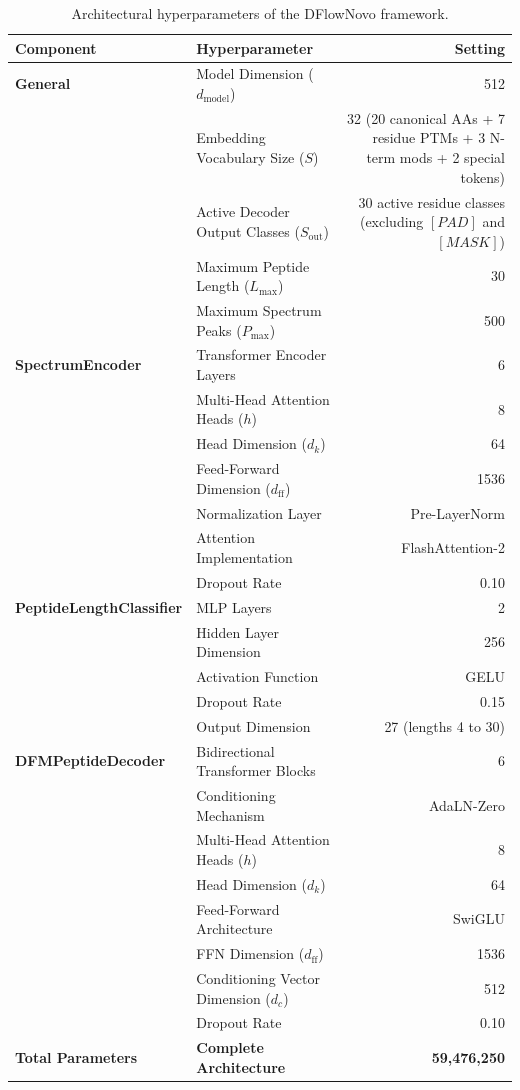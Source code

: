 \begin{table}[!ht]
\centering
\small
\begin{tabular}{llr}
\toprule
\textbf{Component} & \textbf{Hyperparameter} & \textbf{Setting} \\
\midrule
\textbf{General} & Model Dimension ($d_{\text{model}}$) & 512 \\
& Embedding Vocabulary Size ($S$) & 32 (20 canonical AAs + 7 residue PTMs + 3 N-term mods + 2 special tokens) \\
& Active Decoder Output Classes ($S_{\text{out}}$) & 30 active residue classes (excluding $[PAD]$ and $[MASK]$) \\
& Maximum Peptide Length ($L_{\max}$) & 30 \\
& Maximum Spectrum Peaks ($P_{\max}$) & 500 \\
\midrule
\textbf{SpectrumEncoder} & Transformer Encoder Layers & 6 \\
& Multi-Head Attention Heads ($h$) & 8 \\
& Head Dimension ($d_k$) & 64 \\
& Feed-Forward Dimension ($d_{\text{ff}}$) & 1536 \\
& Normalization Layer & Pre-LayerNorm \citep{Xiong2020} \\
& Attention Implementation & FlashAttention-2 \citep{Dao2022} \\
& Dropout Rate & 0.10 \\
\midrule
\textbf{PeptideLengthClassifier} & MLP Layers & 2 \\
& Hidden Layer Dimension & 256 \\
& Activation Function & GELU \\
& Dropout Rate & 0.15 \\
& Output Dimension & 27 (lengths 4 to 30) \\
\midrule
\textbf{DFMPeptideDecoder} & Bidirectional Transformer Blocks & 6 \\
& Conditioning Mechanism & AdaLN-Zero \citep{Peebles2023} \\
& Multi-Head Attention Heads ($h$) & 8 \\
& Head Dimension ($d_k$) & 64 \\
& Feed-Forward Architecture & SwiGLU \citep{Shazeer2020} \\
& FFN Dimension ($d_{\text{ff}}$) & 1536 \\
& Conditioning Vector Dimension ($d_c$) & 512 \\
& Dropout Rate & 0.10 \\
\midrule
\textbf{Total Parameters} & \textbf{Complete Architecture} & \textbf{59,476,250} \\
\bottomrule
\end{tabular}
\caption{Architectural hyperparameters of the DFlowNovo framework.}
\label{tab:model_hyperparameters}
\end{table}

